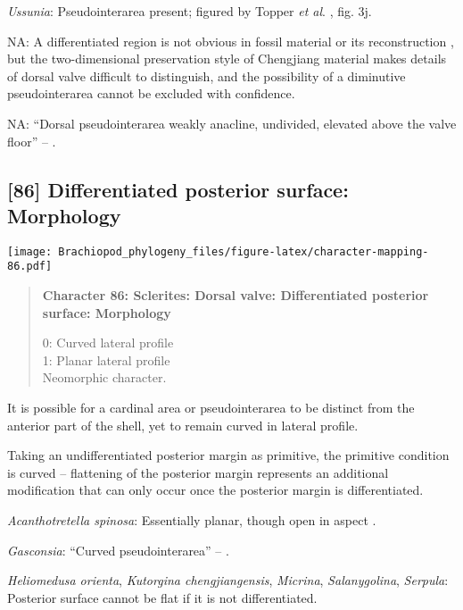 \documentclass[openany]{book}
\theoremstyle{definition}
\theoremstyle{definition}
\theoremstyle{definition}
\theoremstyle{remark}
\begin{document}
\hypertarget{Ussunia-coding-85}{}
\emph{Ussunia}: Pseudointerarea present; figured by Topper \emph{et al}.
\citeyearpar{Topper2013Reappraisalof}, fig. 3j.

\hypertarget{NA-coding-85}{}
NA: A differentiated region is not obvious in fossil material or its
reconstruction \citep{Zhang2014Anearly}, but the two-dimensional
preservation style of Chengjiang material makes details of dorsal valve
difficult to distinguish, and the possibility of a diminutive
pseudointerarea cannot be excluded with confidence.

\hypertarget{NA-coding-85}{}
NA: ``Dorsal pseudointerarea weakly anacline, undivided, elevated above
the valve floor'' -- \citet{Popov2009Earlyontogeny}.

\subsection*{{[}86{]} Differentiated posterior surface:
Morphology}\label{differentiated-posterior-surface-morphology}

\texttt{[image: Brachiopod\_phylogeny\_files/figure-latex/character-mapping-86.pdf]}

\begin{quote}
\textbf{Character 86: Sclerites: Dorsal valve: Differentiated posterior
surface: Morphology}

0: Curved lateral profile\\
1: Planar lateral profile\\
Neomorphic character.
\end{quote}

It is possible for a cardinal area or pseudointerarea to be distinct
from the anterior part of the shell, yet to remain curved in lateral
profile.

Taking an undifferentiated posterior margin as primitive, the primitive
condition is curved -- flattening of the posterior margin represents an
additional modification that can only occur once the posterior margin is
differentiated.

\hypertarget{Acanthotretella_spinosa-coding-86}{}
\emph{Acanthotretella spinosa}: Essentially planar, though open in
aspect \citep[following Chiton in][]{Schwabe2010}.

\hypertarget{Gasconsia-coding-86}{}
\emph{Gasconsia}: ``Curved pseudointerarea'' --
\citet{Skovsted2017Depthrelated}.

\hypertarget{Heliomedusa_orienta-coding-86}{}
\emph{Heliomedusa orienta}, \emph{Kutorgina chengjiangensis},
\emph{Micrina}, \emph{Salanygolina}, \emph{Serpula}: Posterior surface
cannot be flat if it is not differentiated.
\end{document}
